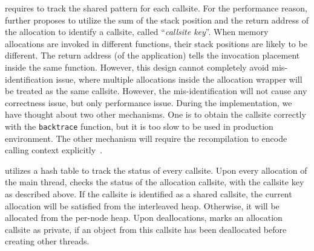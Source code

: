 \NM{} requires to track the shared pattern for each callsite. For the performance reason, \NA{} further proposes to utilize the sum of the stack position and the return address of the allocation to identify a callsite, called ``\textit{callsite key}''. 
  When memory allocations are invoked in different functions, their stack positions are likely to be different. The return address (of the application) tells the invocation placement inside the same function. However, this design cannot completely avoid mis-identification issue,  where multiple allocations inside the allocation wrapper will be treated as the same callsite. However, the mis-identification will not cause any correctness issue, but only performance issue. During the implementation, we have thought about two other mechanisms. One is to obtain the callsite correctly with the \texttt{backtrace} function, but it is too slow to be used in production environment. The other mechanism will require the recompilation to encode calling context explicitly~\cite{DBLP:conf/icse/SumnerZWZ10, DBLP:conf/cgo/ZengR0AJ014}.
  

\NA{} utilizes a hash table to track the status of every callsite. Upon every allocation of the main thread, \NA{} checks the status of the allocation callsite, with the callsite key as described above. If the callsite is identified as a shared callsite, the current allocation will be satisfied from the interleaved heap. Otherwise, it will be allocated from the per-node heap. Upon deallocations, \NM{} marks an allocation callsite as private, if an object from this callsite has been deallocated before creating other threads. 

